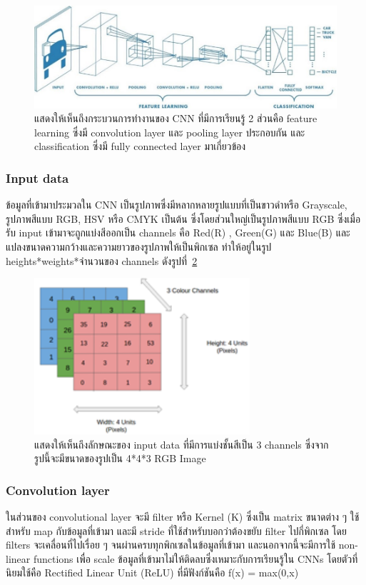 \documentclass[12pt,oneside,openright,a4paper]{cpe-thai-project}
\begin{document}
\begin{figure}[!h]
  \centering
  \includegraphics[width=12cm]{./image/cnn.jpg}
  \caption{แสดงให้เห็นถึงกระบวนการทำงานของ CNN ที่มีการเรียนรู้ 2 ส่วนคือ feature learning ซึ่งมี convolution layer และ pooling layer ประกอบกัน และ classification ซึ่งมี fully connected layer มาเกี่ยวข้อง}
  \label{fig:pic-cnn}
\end{figure}


\subsubsection{Input data}
\par\setlength{\parindent}{5ex}
ข้อมูลที่เข้ามาประมวลใน CNN เป็นรูปภาพซึ่งมีหลากหลายรูปแบบที่เป็นขาวดำหรือ Grayscale, รูปภาพสีแบบ RGB, HSV หรือ CMYK เป็นต้น ซึ่งโดยส่วนใหญ่เป็นรูปภาพสีแบบ RGB ซึ่งเมื่อรับ input เข้ามาจะถูกแบ่งสีออกเป็น channels คือ Red(R) , Green(G) และ Blue(B) และแปลงขนาดความกว้างและความยาวของรูปภาพให้เป็นพิกเซล 
ทำให้อยู่ในรูป heights*weights*จำนวนของ channels ดังรูปที่~\ref{fig:rgb-layer}

\begin{figure}[!h]
  \centering
  \includegraphics[width=8cm]{./image/unit3.png}
  \caption{แสดงให้เห็นถึงลักษณะของ input data ที่มีการแบ่งชั้นสีเป็น 3 channels ซึ่งจากรูปนี้จะมีขนาดของรูปเป็น 4*4*3 RGB Image}
  \label{fig:rgb-layer}
\end{figure}

\subsubsection{Convolution layer}
\par\setlength{\parindent}{5ex}
ในส่วนของ convolutional layer จะมี filter หรือ Kernel (K) ซึ่งเป็น matrix ขนาดต่าง ๆ ใช้สำหรับ map กับข้อมูลที่เข้ามา และมี stride ที่ใช้สำหรับบอกว่าต้องขยับ filter ไปกี่พิกเซล โดย filters จะเคลื่อนที่ไปเรื่อย ๆ จนผ่านครบทุกพิกเซลในข้อมูลที่เข้ามา และนอกจากนี้จะมีการใช้ non-linear functions เพื่อ scale ข้อมูลที่เข้ามาไม่ให้ติดลบซึ่งเหมาะกับการเรียนรู้ใน CNNs โดยตัวที่นิยมใช้คือ Rectified Linear Unit (ReLU) ที่มีฟังก์ชันคือ ƒ(x) = max(0,x) 
\end{document}
